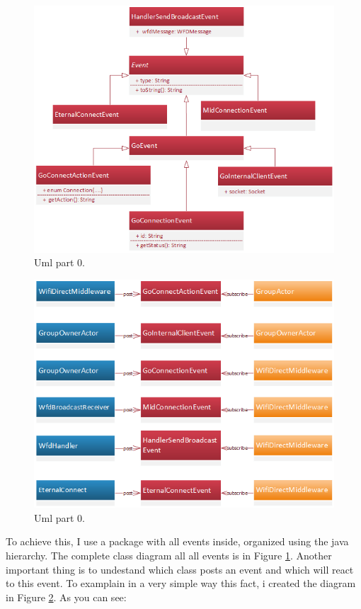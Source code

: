 \begin{figure}[thpb]
	\centering
	\includegraphics[scale=0.7]{./images/chap2/event-hyerarchy.png}
	\caption{Uml part 0.}
	\label{event-hyeranchy}
\end{figure}	

\begin{figure}[thpb]
	\centering
	\includegraphics[scale=0.7]{./images/chap2/event-subscribe-post.png}
	\caption{Uml part 0.}
	\label{event-subscribe-post}
\end{figure}	

To achieve this, I use a package with all events inside, organized using the java hierarchy. The complete class diagram all all events is in Figure \ref{event-hyeranchy}.
Another important thing is to undestand which class posts an event and which will react to this event.
To examplain in a very simple way this fact, i created the diagram in Figure \ref{event-subscribe-post}. As you can see:

